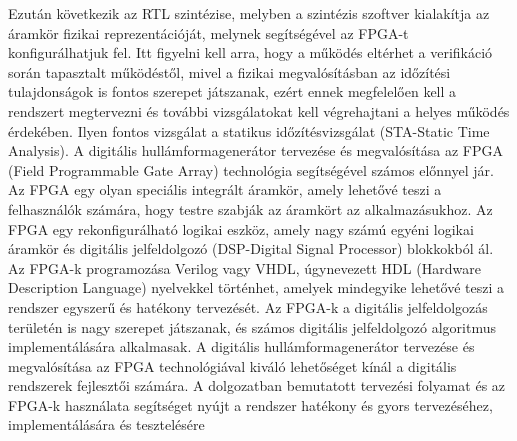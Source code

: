 \documentclass[a4paper,12pt]{article}
\begin{document}
			Ezután következik az RTL szintézise, melyben a szintézis szoftver kialakítja az áramkör fizikai reprezentációját, melynek segítségével az FPGA-t konfigurálhatjuk fel. Itt figyelni kell arra, hogy a működés eltérhet a verifikáció során tapasztalt működéstől, mivel a fizikai megvalósításban az időzítési tulajdonságok is fontos szerepet játszanak, ezért ennek megfelelően kell a rendszert megtervezni és további vizsgálatokat kell végrehajtani a helyes működés érdekében. Ilyen fontos vizsgálat a statikus időzítésvizsgálat (STA-Static Time Analysis).
			A digitális hullámformagenerátor tervezése és megvalósítása az FPGA (Field Programmable Gate Array) technológia segítségével számos előnnyel jár. Az FPGA egy olyan speciális integrált áramkör, amely lehetővé teszi a felhasználók számára, hogy testre szabják az áramkört az alkalmazásukhoz. Az FPGA egy rekonfigurálható logikai eszköz, amely nagy számú egyéni logikai áramkör és digitális jelfeldolgozó (DSP-Digital Signal Processor) blokkokból ál. Az FPGA-k programozása Verilog vagy VHDL, úgynevezett HDL (Hardware Description Language) nyelvekkel történhet, amelyek mindegyike lehetővé teszi a rendszer egyszerű és hatékony tervezését. Az FPGA-k a digitális jelfeldolgozás területén is nagy szerepet játszanak, és számos digitális jelfeldolgozó algoritmus implementálására alkalmasak.
			A digitális hullámformagenerátor tervezése és megvalósítása az FPGA technológiával kiváló lehetőséget kínál a digitális rendszerek fejlesztői számára. A dolgozatban bemutatott tervezési folyamat és az FPGA-k használata segítséget nyújt a rendszer hatékony és gyors tervezéséhez, implementálására és tesztelésére
	
			
			
\end{document}
